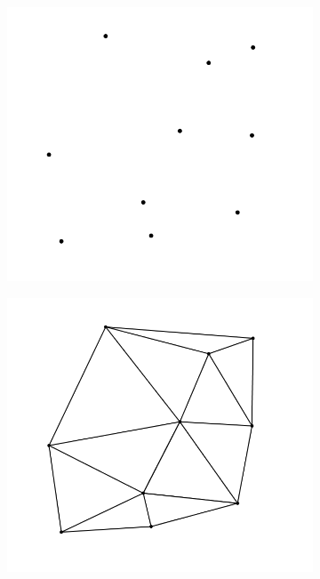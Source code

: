 \begin{figure}[ht]
\begin{subfigure}{0.31\textwidth}
\includegraphics[width=\linewidth]{Figures/DTEx_a.png}
\caption{} \label{fig:DTEx_a}
\end{subfigure}
\hspace*{\fill} %
\begin{subfigure}{0.31\textwidth}
\includegraphics[width=\linewidth]{Figures/DTEx_b.png}

\end{subfigure}
\end{figure}
